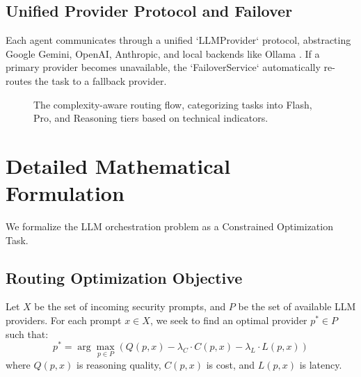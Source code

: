 \documentclass[conference,compsoc]{IEEEtran}
\begin{document}
\subsection{Unified Provider Protocol and Failover}
Each agent communicates through a unified `LLMProvider` protocol, abstracting Google Gemini, OpenAI, Anthropic, and local backends like Ollama \cite{ollama}. If a primary provider becomes unavailable, the `FailoverService` automatically re-routes the task to a fallback provider.

\begin{figure}[htbp]
\centering
{}
\caption{The complexity-aware routing flow, categorizing tasks into Flash, Pro, and Reasoning tiers based on technical indicators.}
\label{fig:routing}
\end{figure}

\section{Detailed Mathematical Formulation}
We formalize the LLM orchestration problem as a Constrained Optimization Task.

\subsection{Routing Optimization Objective}
Let $X$ be the set of incoming security prompts, and $P$ be the set of available LLM providers. For each prompt $x \in X$, we seek to find an optimal provider $p^* \in P$ such that:
\begin{equation}
p^* = \arg \max_{p \in P} \left( Q(p, x) - \lambda_C \cdot C(p, x) - \lambda_L \cdot L(p, x) \right)
\end{equation}
where $Q(p, x)$ is reasoning quality, $C(p, x)$ is cost, and $L(p, x)$ is latency.
\end{document}
